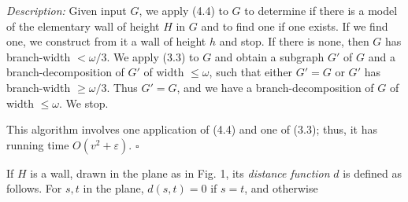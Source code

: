 \textit{Description:} Given input $G$, we apply (4.4) to $G$ to determine if there is a model of the elementary wall of height $H$ in $G$ and to find one if one exists. If we find one, we construct from it a wall of height $h$ and stop. If there is none, then $G$ has branch-width $< \omega/3$. We apply (3.3) to $G$ and obtain a subgraph $G'$ of $G$ and a branch-decomposition of $G'$ of width $\le \omega$, such that either $G' = G$ or $G'$ has branch-width $\ge \omega/3$. Thus $G' = G$, and we have a branch-decomposition of $G$ of width $\le \omega$. We stop.

This algorithm involves one application of (4.4) and one of (3.3); thus, it has running time $O(v^2 + \varepsilon)$. $\square$

If $H$ is a wall, drawn in the plane as in Fig. 1, its \textit{distance function} $d$ is defined as follows. For $s, t$ in the plane, $d(s, t) = 0$ if $s = t$, and otherwise

